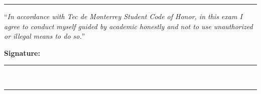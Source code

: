 \rule{18.2cm}{0.6mm}
\vspace{-0.25cm}
``\textit{In accordance with Tec de Monterrey Student Code of Honor, in this exam I agree to conduct myself guided by academic honestly and not to use unauthorized or illegal means to do so.}''
\begin{flushright}
        \textbf{Signature:}\;\rule{3cm}{0.1mm}\\
\end{flushright}
\rule{18.2cm}{0.6mm}